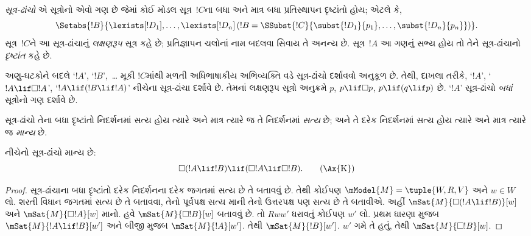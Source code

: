 \begingroup
\makeatletter{}\makeatother


\label{guunit:OLP-0417}


\begin{defn}
  \emph{સૂત્ર-ઢાંચો} એ સૂત્રોનો એવો ગણ છે જેમાં
  કોઈ મોડલ સૂત્ર~$!C$ના બધા અને માત્ર બધા
  પ્રતિસ્થાપન દૃષ્ટાંતો હોય; એટલે કે,
  \[
  \Setabs{!B}{\lexists[!D_1], \dots, \lexists[!D_n] \left(!B =
  \SSubst{!C}{\subst{!D_1}{p_1}, \dots, \subst{!D_n}{p_n}} \right) }.
  \]
  સૂત્ર~$!C$ને આ સૂત્ર-ઢાંચાનું \emph{લક્ષણરૂપ}
  સૂત્ર કહે છે; પ્રતિજ્ઞાપન ચલોનાં નામ બદલવા સિવાય તે અનન્ય છે.
  સૂત્ર~$!A$ આ ગણનું સભ્ય હોય તો તેને
  સૂત્ર-ઢાંચાનો \emph{દૃષ્ટાંત} કહે છે.
\end{defn}

અણુ-ઘટકોને બદલે `$!A$', `$!B$',~\dots{} મૂકી
$!C$માંથી મળતી અધિભાષાકીય અભિવ્યક્તિ વડે
સૂત્ર-ઢાંચો દર્શાવવો અનુકૂળ છે. તેથી, દાખલા તરીકે,
`$!A$', `$!A \lif \Box!A$', `$!A \lif (!B \lif !A)$'
નીચેના સૂત્ર-ઢાંચા દર્શાવે છે. તેમનાં લક્ષણરૂપ
સૂત્રો અનુક્રમે $p$, $p \lif \Box p$, $p \lif (q
\lif p)$ છે. `$!A$' સૂત્ર-ઢાંચો \emph{બધાં}
સૂત્રોનો ગણ દર્શાવે છે.

\begin{defn}
  સૂત્ર-ઢાંચો તેના બધા દૃષ્ટાંતો નિદર્શનમાં સત્ય હોય
  ત્યારે અને માત્ર ત્યારે જ તે નિદર્શનમાં \emph{સત્ય} છે;
  અને તે દરેક નિદર્શનમાં સત્ય હોય ત્યારે અને માત્ર
  ત્યારે જ \emph{માન્ય} છે.
\end{defn}

\begin{prop}
  નીચેનો સૂત્ર-ઢાંચો  માન્ય છે:
  \begin{equation*}
  \Box(!A \lif !B) \lif (\Box !A \lif \Box !B). \tag{\Ax{K}}
  \end{equation*}
\end{prop}

\begin{proof}
  સૂત્ર-ઢાંચાના બધા દૃષ્ટાંતો દરેક નિદર્શનના દરેક
  જગતમાં સત્ય છે તે બતાવવું છે. તેથી કોઈપણ
  $\mModel{M} = \tuple{W,R,V}$ અને $w \in
  W$ લો. શરતી વિધાન જગતમાં સત્ય છે તે બતાવવા,
  તેનો પૂર્વપક્ષ સત્ય માની તેનો ઉત્તરપક્ષ પણ સત્ય
  છે તે બતાવીએ. અહીં $\mSat{M}{\Box(!A \lif !B)}[w]$
  અને $\mSat{M}{\Box !A}[w]$ માનો. હવે
  $\mSat{M}{\Box !B}[w]$ બતાવવું છે. તો $Rww'$
  ધરાવતું કોઈપણ $w'$ લો. પ્રથમ ધારણા મુજબ
  $\mSat{M}{!A \lif !B}[w']$ અને બીજી મુજબ
  $\mSat{M}{!A}[w']$. તેથી $\mSat{M}{!B}[w']$.
  $w'$ ગમે તે હતું, તેથી $\mSat{M}{\Box !B}[w]$.
\end{proof}

